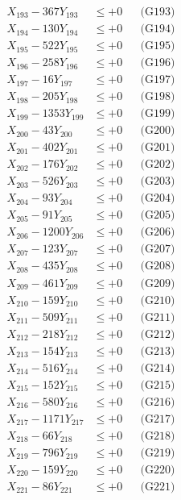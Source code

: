 \documentclass[a4paper,10pt]{article}
\begin{document}
{\begin{align}
X_{193} - 367Y_{193} &\leq +0 && \text{(G193)} \\
X_{194} - 130Y_{194} &\leq +0 && \text{(G194)} \\
X_{195} - 522Y_{195} &\leq +0 && \text{(G195)} \\
X_{196} - 258Y_{196} &\leq +0 && \text{(G196)} \\
X_{197} - 16Y_{197} &\leq +0 && \text{(G197)} \\
X_{198} - 205Y_{198} &\leq +0 && \text{(G198)} \\
X_{199} - 1353Y_{199} &\leq +0 && \text{(G199)} \\
X_{200} - 43Y_{200} &\leq +0 && \text{(G200)} \\
\allowbreak
X_{201} - 402Y_{201} &\leq +0 && \text{(G201)} \\
X_{202} - 176Y_{202} &\leq +0 && \text{(G202)} \\
X_{203} - 526Y_{203} &\leq +0 && \text{(G203)} \\
X_{204} - 93Y_{204} &\leq +0 && \text{(G204)} \\
X_{205} - 91Y_{205} &\leq +0 && \text{(G205)} \\
X_{206} - 1200Y_{206} &\leq +0 && \text{(G206)} \\
X_{207} - 123Y_{207} &\leq +0 && \text{(G207)} \\
X_{208} - 435Y_{208} &\leq +0 && \text{(G208)} \\
X_{209} - 461Y_{209} &\leq +0 && \text{(G209)} \\
X_{210} - 159Y_{210} &\leq +0 && \text{(G210)} \\
\allowbreak
X_{211} - 509Y_{211} &\leq +0 && \text{(G211)} \\
X_{212} - 218Y_{212} &\leq +0 && \text{(G212)} \\
X_{213} - 154Y_{213} &\leq +0 && \text{(G213)} \\
X_{214} - 516Y_{214} &\leq +0 && \text{(G214)} \\
X_{215} - 152Y_{215} &\leq +0 && \text{(G215)} \\
X_{216} - 580Y_{216} &\leq +0 && \text{(G216)} \\
X_{217} - 1171Y_{217} &\leq +0 && \text{(G217)} \\
X_{218} - 66Y_{218} &\leq +0 && \text{(G218)} \\
X_{219} - 796Y_{219} &\leq +0 && \text{(G219)} \\
X_{220} - 159Y_{220} &\leq +0 && \text{(G220)} \\
\allowbreak
X_{221} - 86Y_{221} &\leq +0 && \text{(G221)} \\

\end{align}}
\end{document}
